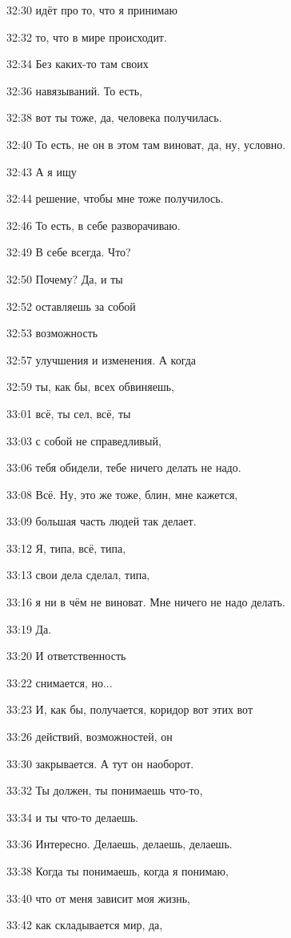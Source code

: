 32:30
идёт про то, что я принимаю

32:32
то, что в мире происходит.

32:34
Без каких-то там своих

32:36
навязываний. То есть,

32:38
вот ты тоже, да, человека получилась.

32:40
То есть, не он в этом там виноват, да, ну, условно.

32:43
А я ищу

32:44
решение, чтобы мне тоже получилось.

32:46
То есть, в себе разворачиваю.

32:49
В себе всегда. Что?

32:50
Почему? Да, и ты

32:52
оставляешь за собой

32:53
возможность

32:57
улучшения и изменения. А когда

32:59
ты, как бы, всех обвиняешь,

33:01
всё, ты сел, всё, ты

33:03
с собой не справедливый,

33:06
тебя обидели, тебе ничего делать не надо.

33:08
Всё. Ну, это же тоже, блин, мне кажется,

33:09
большая часть людей так делает.

33:12
Я, типа, всё, типа,

33:13
свои дела сделал, типа,

33:16
я ни в чём не виноват. Мне ничего не надо делать.

33:19
Да.

33:20
И ответственность

33:22
снимается, но...

33:23
И, как бы, получается, коридор вот этих вот

33:26
действий, возможностей, он

33:30
закрывается. А тут он наоборот.

33:32
Ты должен, ты понимаешь что-то,

33:34
и ты что-то делаешь.

33:36
Интересно. Делаешь, делаешь, делаешь.

33:38
Когда ты понимаешь, когда я понимаю,

33:40
что от меня зависит моя жизнь,

33:42
как складывается мир, да,

